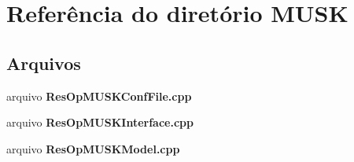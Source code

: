 \section{Referência do diretório M\+U\+SK}
\label{dir_2c2e35c699b4630ba7bc643cc47d6329}
\subsection*{Arquivos}
\begin{DoxyCompactItemize}
\item 
arquivo {\bf Res\+Op\+M\+U\+S\+K\+Conf\+File.\+cpp}
\item 
arquivo {\bf Res\+Op\+M\+U\+S\+K\+Interface.\+cpp}
\item 
arquivo {\bf Res\+Op\+M\+U\+S\+K\+Model.\+cpp}
\end{DoxyCompactItemize}
